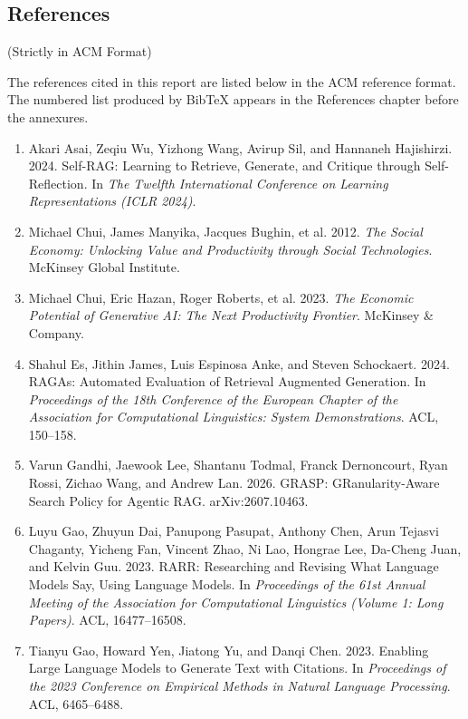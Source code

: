 \documentclass[oneside,a4paper,12pt]{report}
\begin{document}
\begin{appendices}

\chapter{References}
(Strictly in ACM Format)

The references cited in this report are listed below in the ACM reference format. The numbered list produced by BibTeX appears in the References chapter before the annexures.

\begin{enumerate}
\setlength{\itemsep}{2pt}
\small
\item Akari Asai, Zeqiu Wu, Yizhong Wang, Avirup Sil, and Hannaneh Hajishirzi. 2024. Self-RAG: Learning to Retrieve, Generate, and Critique through Self-Reflection. In \textit{The Twelfth International Conference on Learning Representations (ICLR 2024)}.
\item Michael Chui, James Manyika, Jacques Bughin, et al. 2012. \textit{The Social Economy: Unlocking Value and Productivity through Social Technologies}. McKinsey Global Institute.
\item Michael Chui, Eric Hazan, Roger Roberts, et al. 2023. \textit{The Economic Potential of Generative AI: The Next Productivity Frontier}. McKinsey \& Company.
\item Shahul Es, Jithin James, Luis Espinosa Anke, and Steven Schockaert. 2024. RAGAs: Automated Evaluation of Retrieval Augmented Generation. In \textit{Proceedings of the 18th Conference of the European Chapter of the Association for Computational Linguistics: System Demonstrations}. ACL, 150--158.
\item Varun Gandhi, Jaewook Lee, Shantanu Todmal, Franck Dernoncourt, Ryan Rossi, Zichao Wang, and Andrew Lan. 2026. GRASP: GRanularity-Aware Search Policy for Agentic RAG. arXiv:2607.10463.
\item Luyu Gao, Zhuyun Dai, Panupong Pasupat, Anthony Chen, Arun Tejasvi Chaganty, Yicheng Fan, Vincent Zhao, Ni Lao, Hongrae Lee, Da-Cheng Juan, and Kelvin Guu. 2023. RARR: Researching and Revising What Language Models Say, Using Language Models. In \textit{Proceedings of the 61st Annual Meeting of the Association for Computational Linguistics (Volume 1: Long Papers)}. ACL, 16477--16508.
\item Tianyu Gao, Howard Yen, Jiatong Yu, and Danqi Chen. 2023. Enabling Large Language Models to Generate Text with Citations. In \textit{Proceedings of the 2023 Conference on Empirical Methods in Natural Language Processing}. ACL, 6465--6488.

\end{enumerate}
\end{appendices}
\end{document}
